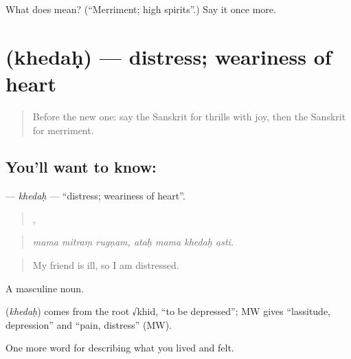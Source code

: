 \begin{tcolorbox}[breakable,colback=teal!4,colframe=teal!35!black,title={Before you move on}]
What does  mean? (\textquotedblleft{}Merriment; high spirits\textquotedblright{}.) Say it once more.
\end{tcolorbox}
\section[\texorpdfstring{\sk{खेदः} (khedaḥ)}{खेदः (khedaḥ)}]{ (khedaḥ) — distress; weariness of heart}

\label{lesson:SA-C448-khedah}



\begin{quote}
Before the new one: say the Sanskrit for thrills with joy, then the Sanskrit for merriment.
\end{quote}

\subsection*{You'll want to know: }
\textbf{} — \emph{khedaḥ} — \textquotedblleft{}distress; weariness of heart\textquotedblright{}.

\begin{quote}
  ,    
\end{quote}

\begin{quote}
\emph{mama mitraṃ rugṇam, ataḥ mama khedaḥ asti.}
\end{quote}

\begin{quote}
My friend is ill, so I am distressed.
\end{quote}

A masculine noun.

\begin{cousinweb}
\textbf{} (\emph{khedaḥ}) comes from the root √khid, \textquotedblleft{}to be depressed\textquotedblright{}; MW gives \textquotedblleft{}lassitude, depression\textquotedblright{} and \textquotedblleft{}pain, distress\textquotedblright{} (MW).
\end{cousinweb}

\begin{grammarlens}[title={What you've built}]
One more word for describing what you lived and felt.
\end{grammarlens}

